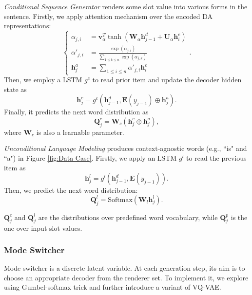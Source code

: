 \documentclass[letterpaper]{article} %
\begin{document}
	\textit{Conditional Sequence Generator} renders some slot value into various forms in the sentence. Firstly, we apply attention mechanism over the encoded DA representations:
	\begin{equation}
	\left\{\begin{aligned}
	\alpha_{j,i} & = \mathbf{v}^T_{\alpha} \tanh(\mathbf{W}_{\alpha} \mathbf{h}^d_{j - 1} + \mathbf{U}_{\alpha}\mathbf{h}^e_i) \\
	\alpha'_{j,i} & = \frac{\exp(\alpha_{j,i})}{\sum_{1 \le k \le n} \exp(\alpha_{j,k})} \\
	\mathbf{h}^a_j & = \sum_{1 \le i \le n} \alpha'_{j,i} \mathbf{h}_i^e
	\end{aligned}\right..
	\end{equation}
	Then, we employ a LSTM $g^c$ to read prior item and update the decoder hidden state as
	\begin{equation}
	\mathbf{h}_j^c = g^c(\mathbf{h}_{j-1}^d, \mathbf{E}(y_{j-1}) \oplus \mathbf{h}^a_j).
	\end{equation}
	Finally, it predicts the next word distribution as
	\begin{equation}
	\mathbf{Q}_j^c = \mathbf{W}_{c} (\mathbf{h}^c_j \oplus \mathbf{h}^a_j),
	\end{equation}
	where $\mathbf{W}_{c}$ is also a learnable parameter.

	\textit{Unconditional Language Modeling} produces context-agnostic words (e.g., ``is" and ``a") in Figure \ref{fig:Data Case}. Firstly, we apply an LSTM $g^l$ to read the previous item as
	\begin{equation}
	\mathbf{h}_j^l = g^l(\mathbf{h}_{j-1}^d, \mathbf{E}(y_{j-1})).
	\end{equation}
	Then, we predict the next word distribution:
	\begin{equation}
	\mathbf{Q}^l_j = \mathrm{Softmax}(\mathbf{W}_l \mathbf{h}_j^l).
	\end{equation}

	$\mathbf{Q}^c_j$ and $\mathbf{Q}^l_j$ are the distributions over predefined word vocabulary, while $\mathbf{Q}^p_j$ is the one over input slot values.

\subsubsection{Mode Switcher}

	Mode switcher is a discrete latent variable. At each generation step, its aim is to choose an appropriate decoder from the renderer set. To implement it, we explore using Gumbel-softmax trick and further introduce a variant of VQ-VAE.
\end{document}
